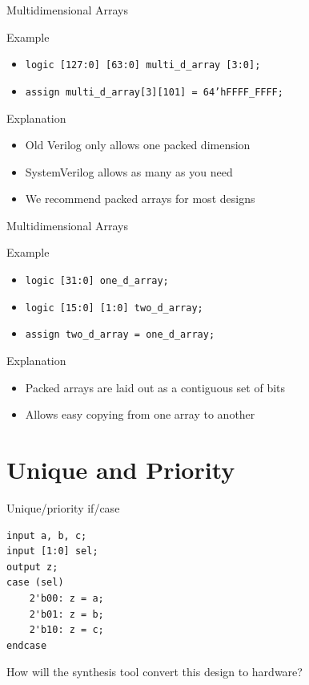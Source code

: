 \documentclass[table,dvipsnames]{beamer}
\begin{document}
\begin{frame}{Multidimensional Arrays}
	\begin{block}{Example}
		\begin{itemize}
			\item \texttt {logic [127:0] [63:0] multi\_d\_array [3:0];}
			\item \texttt {assign multi\_d\_array[3][101] = 64'hFFFF\_FFFF;}
		\end{itemize}
	\end{block}
	\begin{block}{Explanation}
		\begin{itemize}
			\item Old Verilog only allows one packed dimension 
			\item SystemVerilog allows as many as you need 
			\item We recommend packed arrays for most designs
			
		\end{itemize}
	\end{block}
\end{frame}

\begin{frame}{Multidimensional Arrays}
	\begin{block}{Example}
		\begin{itemize}
			\item \texttt {logic [31:0] one\_d\_array;}
			\item \texttt {logic [15:0] [1:0] two\_d\_array;}
			\item \texttt {assign two\_d\_array = one\_d\_array;}
		\end{itemize}
	\end{block}
	\begin{block}{Explanation}
		\begin{itemize}
			\item Packed arrays are laid out as a contiguous set of bits
			\item Allows easy copying from one array to another
		\end{itemize}
	\end{block}
\end{frame}
 
 \section{Unique and Priority}
 \begin{frame}[fragile]{Unique/priority if/case}
	\begin{verbatim}
input a, b, c;
input [1:0] sel;
output z;
case (sel)
	2'b00: z = a;
	2'b01: z = b;
	2'b10: z = c;
endcase	
	\end{verbatim}
	\begin{block}{}
		How will the synthesis tool convert this design to hardware?
	\end{block}

\end{frame}
 
\end{document}
